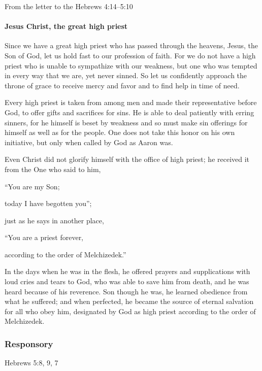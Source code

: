 From the letter to the Hebrews \hfill 4:14--5:10

\paragraph{Jesus Christ, the great high priest}

\lettrine[lines=3]{S}{}ince we have a great high priest who has passed through the heavens, Jesus, the Son of God, let us hold fast to our profession of faith. For we do not have a high priest who is unable to sympathize with our weakness, but one who was tempted in every way that we are, yet never sinned. So let us confidently approach the throne of grace to receive mercy and favor and to find help in time of need.

Every high priest is taken from among men and made their representative before God, to offer gifts and sacrifices for sins. He is able to deal patiently with erring sinners, for he himself is beset by weakness and so must make sin offerings for himself as well as for the people. One does not take this honor on his own initiative, but only when called by God as Aaron was.

Even Christ did not glorify himself with the office of high priest; he received it from the One who said to him,

\vspace{5pt}
   “You are my Son; \par
      today I have begotten you”;

\vspace{5pt}

just as he says in another place,

\vspace{5pt}

   “You are a priest forever,\par
      according to the order of Melchizedek.”

\vspace{5pt}

In the days when he was in the flesh, he offered prayers and supplications with loud cries and tears to God, who was able to save him from death, and he was heard because of his reverence. Son though he was, he learned obedience from what he suffered; and when perfected, he became the source of eternal salvation for all who obey him, designated by God as high priest according to the order of Melchizedek.

\subsubsection{Responsory}
\hfill Hebrews 5:8, 9, 7

